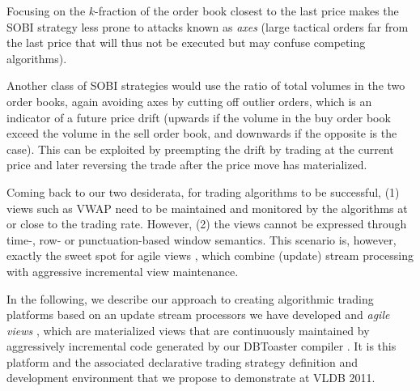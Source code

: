\begin{example}
Focusing on the $k$-fraction of the order book closest to the last price
makes the SOBI strategy less prone to attacks known as {\em axes}\/ (large
tactical orders far from the last price that will thus not be executed but
may confuse competing algorithms).

Another class of SOBI strategies would use the ratio
of total volumes in the two order books, again avoiding axes by cutting off
outlier orders, which is an indicator of a future price drift (upwards if
the volume in the buy order book exceed the volume in the sell order book,
and downwards if the opposite is the case). This can be exploited by preempting
the drift by trading at the current price and later reversing the trade after the price move has materialized.

\punto
\end{example}


Coming back to our two desiderata, for trading algorithms to be successful, (1)
views such as VWAP need to be maintained and monitored by the algorithms at or
close to the trading rate. However, (2) the views cannot be expressed through
time-, row- or punctuation-based window semantics.
This scenario is, however, exactly the sweet spot for agile views
\cite{KAK2011}, which combine (update) stream processing with aggressive
incremental view maintenance.

In the following, we describe our approach to creating algorithmic
trading platforms based on an update stream processors we have developed and
{\em agile views}\/ \cite{KAK2011}, which are materialized views
that are continuously maintained by aggressively incremental code generated
by our DBToaster compiler \cite{ahmad-vldb:09,koch-pods:10,KAK2011}.
It is this platform and the
associated declarative trading strategy definition and development environment
that we propose to demonstrate at VLDB 2011.


